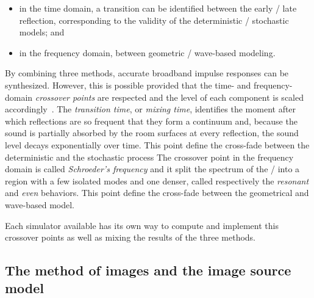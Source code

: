 \begin{figure}
    \resizebox{\linewidth}{!}{
        
        }
    \label{fig:acoustics:3D_ims}
\end{figure}




\begin{itemize}
    \item in the time domain, a transition can be identified between the early \vs/ late reflection, corresponding to the validity of the deterministic \vs/ stochastic models; and
    \item in the frequency domain, between geometric \vs/ wave-based modeling.
\end{itemize}
By combining three methods, accurate broadband impulse responses can be synthesized.
However, this is possible provided that the time- and frequency-domain
\textit{crossover points} are respected and the level of each component is scaled accordingly~.
The \textit{transition time}, or \textit{mixing time}, identifies the moment after which reflections are so frequent that they form a continuum and,
because the sound is partially absorbed by the room surfaces at every reflection,
the sound level decays exponentially over time.
This point define the cross-fade between the deterministic and the stochastic process
The crossover point in the frequency domain is called \textit{Schroeder's frequency}
and it split the spectrum of the \RIR/ into a region with a few isolated modes and one denser,
called respectively the \textit{resonant} and \textit{even} behaviors.
This point define the cross-fade between the geometrical and wave-based model.

Each simulator available has its own way to compute and implement this crossover points as well as mixing the results of the three methods.

\subsection{The method of images and the image source model}\label{subsec:acoustics:ism}

